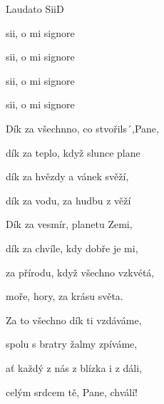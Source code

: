 \begin{song}{Laudato Sii}{D}{}

\begin{SBChorus}

 sii, o mi signore

 sii, o mi signore

 sii, o mi signore

 sii, o mi signore

\end{SBChorus}

\begin{SBVerse}

Dík za všechnno, co stvořils´,Pane,

dík za teplo, když slunce plane

dík za hvězdy a vánek svěží,

dík za vodu, za hudbu z věží

\end{SBVerse}

\begin{SBVerse}

Dík za vesmír, planetu Zemi,

dík za chvíle, kdy dobře je mi,

za přírodu, když všechno vzkvétá,

moře, hory, za krásu světa.

\end{SBVerse}

\begin{SBVerse}

Za to všechno dík ti vzdáváme,

spolu s bratry žalmy zpíváme,

ať každý z nás z blízka i z dáli,

celým srdcem tě, Pane, chválí!

\end{SBVerse}

\end{song}
